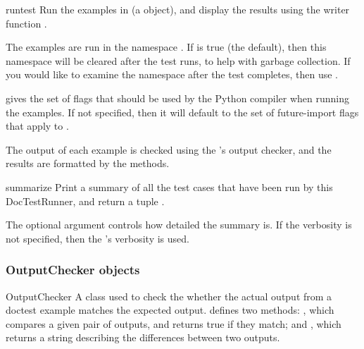 \begin{methoddesc}{run}{test}
    Run the examples in  (a  object), and
    display the results using the writer function .

    The examples are run in the namespace .  If
     is true (the default), then this namespace will
    be cleared after the test runs, to help with garbage collection.
    If you would like to examine the namespace after the test
    completes, then use .

     gives the set of flags that should be used by
    the Python compiler when running the examples.  If not specified,
    then it will default to the set of future-import flags that apply
    to .

    The output of each example is checked using the
    's output checker, and the results are
    formatted by the  methods.
\end{methoddesc}

\begin{methoddesc}{summarize}{}
    Print a summary of all the test cases that have been run by this
    DocTestRunner, and return a tuple .

    The optional  argument controls how detailed the
    summary is.  If the verbosity is not specified, then the
    's verbosity is used.
\end{methoddesc}

\subsubsection{OutputChecker objects\label{doctest-OutputChecker}}

\begin{classdesc}{OutputChecker}{}
    A class used to check the whether the actual output from a doctest
    example matches the expected output.  
    defines two methods: , which compares a given
    pair of outputs, and returns true if they match; and
    , which returns a string describing the
    differences between two outputs.
\end{classdesc}

